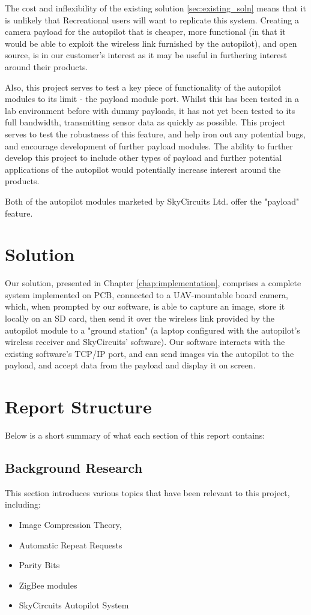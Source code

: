 The cost and inflexibility of the existing solution \ref{sec:existing_soln} 
means that it is unlikely that Recreational users will want to replicate 
this system. Creating a camera payload for the autopilot that is cheaper, 
more functional (in that it would be able to exploit the wireless link 
furnished by the autopilot), and open source, is in our customer's interest 
as it may be useful in furthering interest around their products.

Also, this project serves to test a key piece of functionality of the 
autopilot modules to its limit - the payload module port. Whilst this has 
been tested in a lab environment before with dummy payloads, it has not 
yet been tested to its full bandwidth, transmitting sensor data as quickly 
as possible. This project serves to test the robustness of this feature, 
and help iron out any potential bugs, and encourage development of further 
payload modules. The ability to further develop this project to include 
other types of payload and further potential applications of the autopilot 
would potentially increase interest around the products.

Both of the autopilot modules marketed by SkyCircuits Ltd. offer the "payload" 
feature.

\section{Solution}

Our solution, presented in Chapter \ref{chap:implementation}, comprises a complete system implemented on PCB, connected to a UAV-mountable board camera, which, 
when prompted by our software, is able to capture an image, store it locally 
on an SD card, then send it over the wireless link provided by the autopilot 
module to a "ground station" (a laptop configured with the autopilot's 
wireless receiver and SkyCircuits' software). Our software interacts with 
the existing software's TCP/IP port, and can send images via the autopilot 
to the payload, and accept data from the payload and display it on screen.

\section{Report Structure}

Below is a short summary of what each section of this report contains:

\subsection{Background Research}
This section introduces various topics that have been relevant to this 
project, including:
\begin{itemize}
\item Image Compression Theory, 
\item Automatic Repeat Requests
\item Parity Bits
\item ZigBee modules
\item SkyCircuits Autopilot System
\end{itemize}

